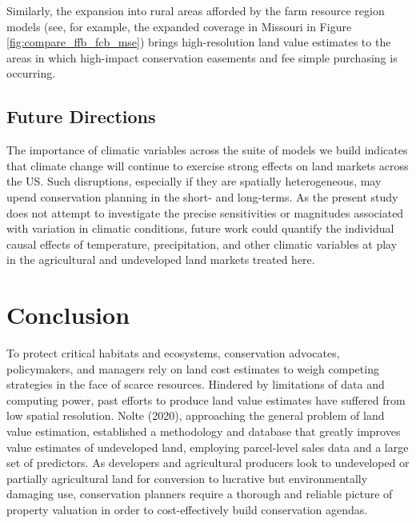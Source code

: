 \documentclass[12pt]{article}
\begin{document}
Similarly, the expansion into rural areas afforded by the farm resource region models (see, for example, the expanded coverage in Missouri in Figure \ref{fig:compare_ffb_fcb_mse}) brings high-resolution land value estimates to the areas in which high-impact conservation easements and fee simple purchasing is occurring.

{\color{red}{Need to confirm this ``high-impact conservtion happens in rural areas" argument. Is it merely a function of lower cost, or is there some higher ecological value in these remote areas? Conservation almanac data may be useful here.}}

\subsection{Future Directions}

The importance of climatic variables across the suite of models we build indicates that climate change will continue to exercise strong effects on land markets across the US. Such disruptions, especially if they are spatially heterogeneous, may upend conservation planning in the short- and long-terms. As the present study does not attempt to investigate the precise sensitivities or magnitudes associated with variation in climatic conditions, future work could quantify the individual causal effects of temperature, precipitation, and other climatic variables at play in the agricultural and undeveloped land markets treated here. 

\section{Conclusion}

To protect critical habitats and ecosystems, conservation advocates, policymakers, and managers rely on land cost estimates to weigh competing strategies in the face of scarce resources. Hindered by limitations of data and computing power, past efforts to produce land value estimates have suffered from low spatial resolution. Nolte (2020), approaching the general problem of land value estimation, established a methodology and database that greatly improves value estimates of undeveloped land, employing parcel-level sales data and a large set of predictors. As developers and agricultural producers look to undeveloped or partially agricultural land for conversion to lucrative but environmentally damaging use, conservation planners require a thorough and reliable picture of property valuation in order to cost-effectively build conservation agendas.
\end{document}
